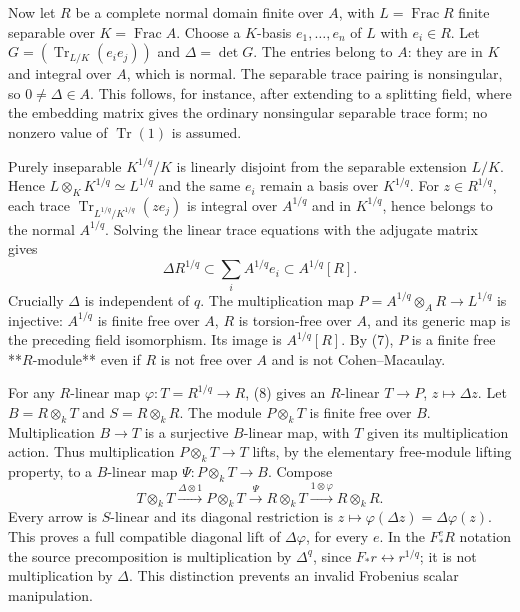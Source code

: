 \documentclass[11pt]{article}
\begin{document}
Now let $R$ be a complete normal domain finite over $A$, with $L=\operatorname{Frac}R$ finite separable over $K=\operatorname{Frac}A$. Choose a $K$-basis $e_1,\ldots,e_n$ of $L$ with $e_i\in R$. Let $G=(\operatorname{Tr}_{L/K}(e_i e_j))$ and $\Delta=\det G$. The entries belong to $A$: they are in $K$ and integral over $A$, which is normal. The separable trace pairing is nonsingular, so $0\ne\Delta\in A$. This follows, for instance, after extending to a splitting field, where the embedding matrix gives the ordinary nonsingular separable trace form; no nonzero value of $\operatorname{Tr}(1)$ is assumed.

Purely inseparable $K^{1/q}/K$ is linearly disjoint from the separable extension $L/K$. Hence $L\otimes_K K^{1/q}\simeq L^{1/q}$ and the same $e_i$ remain a basis over $K^{1/q}$. For $z\in R^{1/q}$, each trace $\operatorname{Tr}_{L^{1/q}/K^{1/q}}(ze_j)$ is integral over $A^{1/q}$ and in $K^{1/q}$, hence belongs to the normal $A^{1/q}$. Solving the linear trace equations with the adjugate matrix gives
\[
 \Delta R^{1/q}\subset\sum_i A^{1/q}e_i\subset A^{1/q}[R]. \tag{8}
\]
Crucially $\Delta$ is independent of $q$. The multiplication map $P=A^{1/q}\otimes_A R\to L^{1/q}$ is injective: $A^{1/q}$ is finite free over $A$, $R$ is torsion-free over $A$, and its generic map is the preceding field isomorphism. Its image is $A^{1/q}[R]$. By (7), $P$ is a finite free **$R$-module** even if $R$ is not free over $A$ and is not Cohen--Macaulay.

For any $R$-linear map $\varphi:T=R^{1/q}\to R$, (8) gives an $R$-linear $T\to P$, $z\mapsto\Delta z$. Let $B=R\otimes_k T$ and $S=R\otimes_k R$. The module $P\otimes_k T$ is finite free over $B$. Multiplication $B\to T$ is a surjective $B$-linear map, with $T$ given its multiplication action. Thus multiplication $P\otimes_k T\to T$ lifts, by the elementary free-module lifting property, to a $B$-linear map $\Psi:P\otimes_k T\to B$. Compose
\[
 T\otimes_k T\xrightarrow{\Delta\otimes1}P\otimes_k T
 \xrightarrow\Psi R\otimes_k T
 \xrightarrow{1\otimes\varphi}R\otimes_k R. \tag{9}
\]
Every arrow is $S$-linear and its diagonal restriction is $z\mapsto\varphi(\Delta z)=\Delta\varphi(z)$. This proves a full compatible diagonal lift of $\Delta\varphi$, for every $e$. In the $F_*^eR$ notation the source precomposition is multiplication by $\Delta^q$, since $F_*r\leftrightarrow r^{1/q}$; it is not multiplication by $\Delta$. This distinction prevents an invalid Frobenius scalar manipulation.
\end{document}
